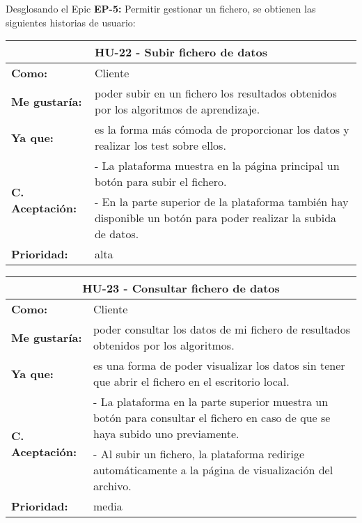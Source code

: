 
\newpage
Desglosando el Epic \textbf{EP-5:} Permitir gestionar un fichero, se obtienen las siguientes historias de usuario:

\begin{table}[H]
	\begin{tabular}{| p{3cm}| p{11cm} |}
		\hline
		\multicolumn{2}{|c|}{\textbf{HU-22} - Subir fichero de datos} \\ \hline
		\textbf{Como:} & Cliente \\ \hline
		\textbf{Me gustaría:} & poder subir en un fichero los resultados obtenidos por los algoritmos de aprendizaje. \\ \hline
		\textbf{Ya que:} & es la forma más cómoda de proporcionar los datos y realizar los test sobre ellos. \\ \hline
		\multirow{2}{11cm}{\textbf{C. Aceptación:}} & - La plataforma muestra en la página principal un botón para subir el fichero. \\
		& - En la parte superior de la plataforma también hay disponible un botón para poder realizar la subida de datos. \\ \hline
		\textbf{\textbf{Prioridad:}} & alta \\ \hline
	\end{tabular}
\end{table}


\begin{table}[H]
	\begin{tabular}{| p{3cm}| p{11cm} |}
		\hline
		\multicolumn{2}{|c|}{\textbf{HU-23} - Consultar fichero de datos} \\ \hline
		\textbf{Como:} & Cliente \\ \hline
		\textbf{Me gustaría:} & poder consultar los datos de mi fichero de resultados obtenidos por los algoritmos. \\ \hline
		\textbf{Ya que:} & es una forma de poder visualizar los datos sin tener que abrir el fichero en el escritorio local. \\ \hline
		\multirow{2}{11cm}{\textbf{C. Aceptación:}} & - La plataforma en la parte superior muestra un botón para consultar el fichero en caso de que se haya subido uno previamente. \\
		& - Al subir un fichero, la plataforma redirige automáticamente a la página de visualización del archivo. \\ \hline
		\textbf{\textbf{Prioridad:}} & media \\ \hline
	\end{tabular}
\end{table}

